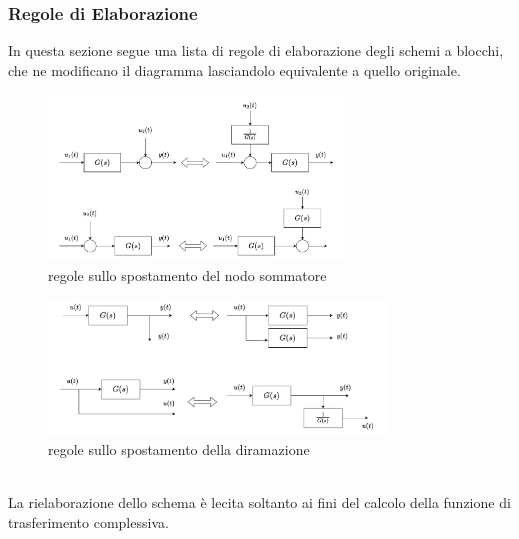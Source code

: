 \documentclass[10pt, letterpaper]{report}
\begin{document}
\subsubsection{Regole di Elaborazione}
In questa sezione segue una lista di regole di elaborazione degli schemi a blocchi, 
che ne modificano il diagramma lasciandolo equivalente a quello originale.
    \begin{figure}[h!]\centering 
        \includegraphics[width=0.7\textwidth ]{images/regola1.pdf}
        \caption{regole sullo spostamento del nodo sommatore}
    \end{figure}
    \begin{figure}[h!]\centering 
        \includegraphics[width=0.8\textwidth ]{images/regole2.pdf}
        \caption{regole sullo spostamento della diramazione}
    \end{figure}\\
La rielaborazione dello schema è lecita soltanto ai fini del calcolo della funzione di trasferimento  
complessiva.
\end{document}
